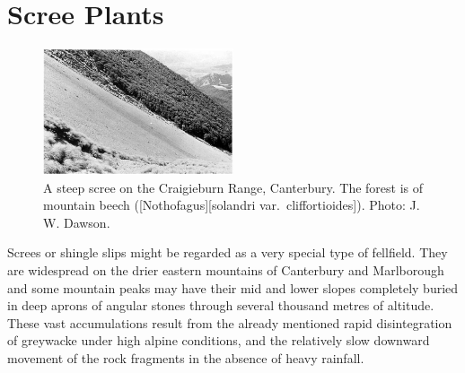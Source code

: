 \section{Scree Plants}

\begin{figure}
	\includegraphics[width=0.5\textwidth]{graphics/figure111craigieburn.jpg}
	\centering
	\caption[A steep scree on the Craigieburn Range]{A steep scree on the Craigieburn Range, Canterbury.
	The forest is of mountain beech ([Nothofagus][solandri var.\ cliffortioides]).
	Photo: J. W. Dawson.}%
	\label{fig:111craigieburn}
\end{figure}

Screes or shingle slips might be regarded as a very special type of fellfield.
They are widespread on the drier eastern mountains of Canterbury and Marlborough and some mountain peaks may have their mid and lower slopes completely buried in deep aprons of angular stones through several thousand metres of altitude.
These vast accumulations result from the already mentioned rapid disintegration of greywacke under high alpine conditions, and the relatively slow downward movement of the rock fragments in the absence of heavy rainfall.

